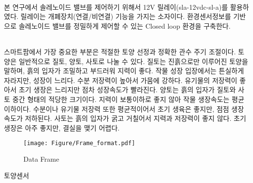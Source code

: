 \documentclass[11pt]{article}
\begin{document}
\indent \\본 연구에서 솔레노이드 밸브를 제어하기 위해서 12V 릴레이(sla-12vdc-sl-a)를 활용하였다. 릴레이는 개폐장치(연결/비연결) 기능을 가지는 소자이다. 환경센서정보를 기반으로 솔레노이드 밸브를 정밀하게 제어할 수 있는 Closed loop 환경을 구축한다. 

\indent \\스마트팜에서 가장 중요한 부분은 적절한 토양 선정과 정확한 관수 주기 조절이다. 토양은 일반적으로 질토, 양토, 사토로 나눌 수 있다.
질토는 진흙으로만 이루어진 토양을 말하며, 흙의 입자가 조밀하고 부드러워 지력이 좋다. 작물 성장 입장에서는 튼실하게 자라지만, 성장이 느리다. 수분 저장력이 높아서 가뭄에 강하다. 유기물의 저장력이 좋아서 초기 생장은 느리지만 점차 성장속도가 빨라진다.
양토는 흙의 입자가 질토와 사토 중간 형태의 적당한 크기이다. 지력이 보통이하로 좋지 않아 작물 생장속도는 평균 이하이다. 수분이나 유기물 저장력 또한 평균적이어서 초기 생육은 좋지만, 점점 생장속도가 저하된다.
사토는 흙의 입자가 굵고 거칠어서 지력과 저장력이 좋지 않다. 초기 생장은 아주 좋지만, 결실을 맺기 어렵다. 


\begin{figure}[!htbp]
    \centering
       \texttt{[image: Figure/Frame\_format.pdf]}
       \hfil
    \caption{Data Frame}
    \label{Data_Frame}
\end{figure}

토양센서


\indent \\
\end{document}
